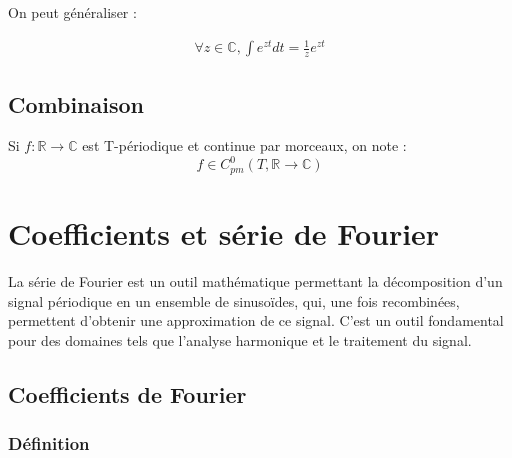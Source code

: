 \documentclass[12pt, a4paper]{article}
\begin{document}
On peut généraliser :

	\begin{equation*}
		\begin{aligned}
			\forall z \in \mathbb{C}, \int e^{zt} dt = \frac{1}{z} e^{zt}
		\end{aligned}
	\end{equation*}


\subsection{Combinaison}

\begin{tcolorbox}
	Si $f:\mathbb{R} \to \mathbb{C}$ est T-périodique et continue par morceaux, on note :
	\begin{equation*}
		f \in C_{pm}^0(T, \mathbb{R} \to \mathbb{C})
	\end{equation*}
\end{tcolorbox}





\clearpage





\section{Coefficients et série de Fourier}

La série de Fourier est un outil mathématique permettant la décomposition d'un signal périodique en un ensemble de sinusoïdes, qui, une fois recombinées, permettent d'obtenir une approximation de ce signal. C'est un outil fondamental pour des domaines tels que l'analyse harmonique et le traitement du signal.

\subsection{Coefficients de Fourier}
\subsubsection{Définition}
\end{document}
